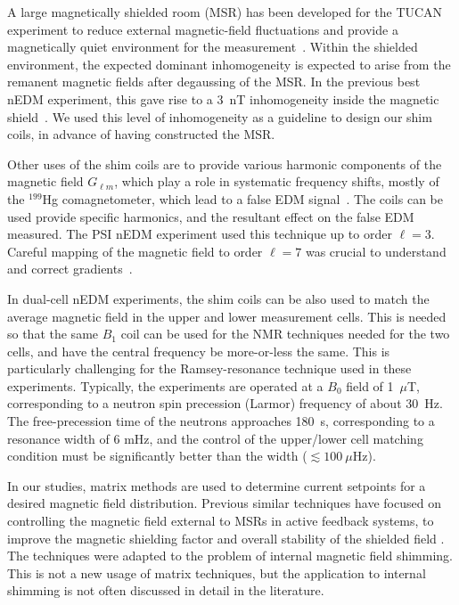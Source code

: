 \documentclass[preprint,12pt]{elsarticle}
\begin{document}
A large magnetically shielded room (MSR) has been developed for the
TUCAN experiment to reduce external magnetic-field fluctuations and
provide a magnetically quiet environment for the
measurement~\cite{bib:msr_rsi}.  Within the shielded environment, the
expected dominant inhomogeneity is expected to arise from the remanent
magnetic fields after degaussing of the MSR.  In the previous best
nEDM experiment, this gave rise to a 3~nT inhomogeneity inside the
magnetic shield~\cite{bib:find-it}.  We used this level of
inhomogeneity as a guideline to design our shim coils, in advance of
having constructed the MSR.

Other uses of the shim coils are to provide various harmonic
components of the magnetic field $G_{\ell m}$, which play a role in
systematic frequency shifts, mostly of the $^{199}$Hg comagnetometer,
which lead to a false EDM signal~\cite{bib:Abel2019-I-think}.  The
coils can be used provide specific harmonics, and the resultant effect
on the false EDM measured.  The PSI nEDM experiment used this
technique up to order $\ell=3$.  Careful mapping of the magnetic field
to order $\ell=7$ was crucial to understand and correct
gradients~\cite{bib:Abel2022Mapping}.

In dual-cell nEDM experiments, the shim coils can be also used to
match the average magnetic field in the upper and lower measurement
cells.  This is needed so that the same $B_1$ coil can be used for the
NMR techniques needed for the two cells, and have the central
frequency be more-or-less the same.  This is particularly challenging
for the Ramsey-resonance technique used in these experiments.
Typically, the experiments are operated at a $B_0$ field of 1~$\mu$T,
corresponding to a neutron spin precession (Larmor) frequency of about
30~Hz.  The free-precession time of the neutrons approaches 180~s,
corresponding to a resonance width of 6 mHz, and the control of the
upper/lower cell matching condition must be significantly better than
the width ($\lesssim 100~\mu$Hz).

In our studies, matrix methods are used to determine current setpoints
for a desired magnetic field distribution.  Previous similar
techniques have focused on controlling the magnetic field external to
MSRs in active feedback systems, to improve the magnetic shielding
factor and overall stability of the shielded field
\cite{bib:franke-thesis,bib:rawlik-thesis,bib:shomi-thesis,bib:rawlik-amjphys,bib:abel-epjc-2023,bib:arxiv2601.22960}.
The techniques were adapted to the problem of internal magnetic field
shimming.  This is not a new usage of matrix techniques, but the
application to internal shimming is not often discussed in detail in
the literature.
\end{document}
